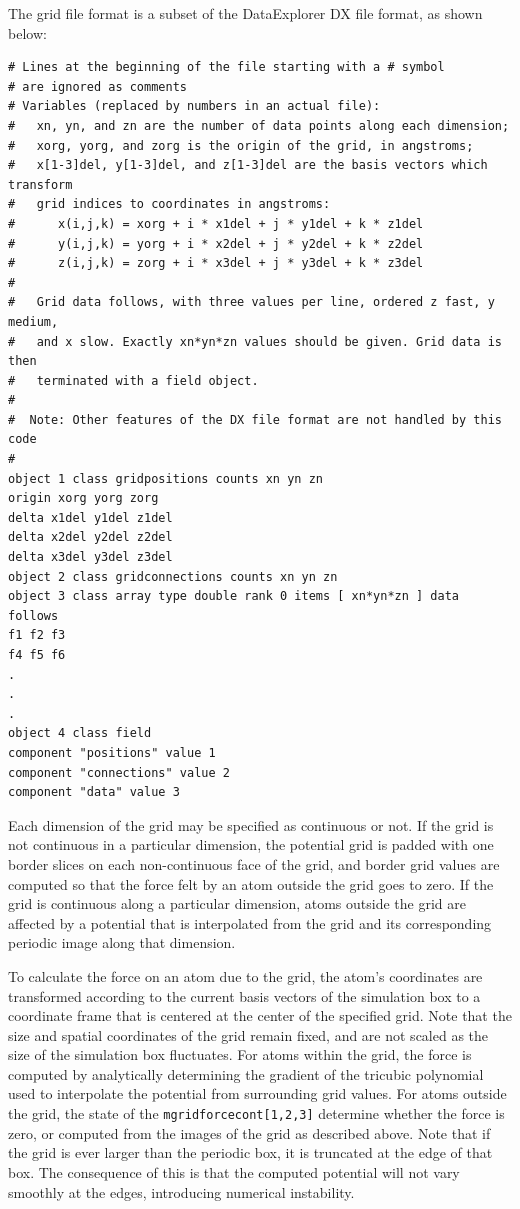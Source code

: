 The grid file format is a subset of the DataExplorer DX file format, as shown below:
\begin{verbatim}
# Lines at the beginning of the file starting with a # symbol 
# are ignored as comments
# Variables (replaced by numbers in an actual file):
#   xn, yn, and zn are the number of data points along each dimension;
#   xorg, yorg, and zorg is the origin of the grid, in angstroms;
#   x[1-3]del, y[1-3]del, and z[1-3]del are the basis vectors which transform
#   grid indices to coordinates in angstroms:
#      x(i,j,k) = xorg + i * x1del + j * y1del + k * z1del
#      y(i,j,k) = yorg + i * x2del + j * y2del + k * z2del
#      z(i,j,k) = zorg + i * x3del + j * y3del + k * z3del
#
#   Grid data follows, with three values per line, ordered z fast, y medium,
#   and x slow. Exactly xn*yn*zn values should be given. Grid data is then
#   terminated with a field object.
#   
#  Note: Other features of the DX file format are not handled by this code
#
object 1 class gridpositions counts xn yn zn
origin xorg yorg zorg
delta x1del y1del z1del
delta x2del y2del z2del
delta x3del y3del z3del
object 2 class gridconnections counts xn yn zn
object 3 class array type double rank 0 items [ xn*yn*zn ] data follows
f1 f2 f3
f4 f5 f6
.
.
.
object 4 class field
component "positions" value 1
component "connections" value 2
component "data" value 3
\end{verbatim}

Each dimension of the grid may be specified as continuous or not. If the grid is not continuous in a particular dimension, the potential grid is padded with one border slices on each non-continuous face of the grid, and border grid values are computed so that the force felt by an atom outside the grid goes to zero. If the grid is continuous along a particular dimension, atoms outside the grid are affected by a potential that is interpolated from the grid and its corresponding periodic image along that dimension.

To calculate the force on an atom due to the grid, the atom's coordinates are transformed according to the current basis vectors of the simulation box to a coordinate frame that is centered at the center of the specified grid. Note that the size and spatial coordinates of the grid remain fixed, and are not scaled as the size of the simulation box fluctuates. For atoms within the grid, the force is computed by analytically determining the gradient of the tricubic polynomial used to interpolate the potential from surrounding grid values. For atoms outside the grid, the state of the {\tt mgridforcecont[1,2,3]} determine whether the force is zero, or computed from the images of the grid as described above. Note that if the grid is ever larger than the periodic box, it is truncated at the edge of that box. The consequence of this is that the computed potential will not vary smoothly at the edges, introducing numerical instability.

